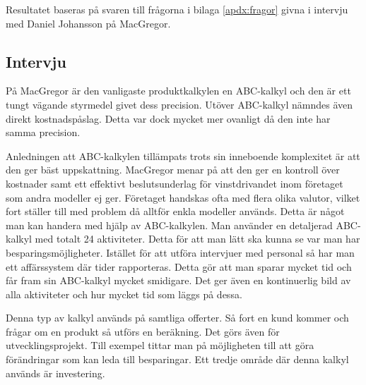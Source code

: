 Resultatet baseras på svaren till frågorna i bilaga \ref{apdx:fragor} givna i intervju med Daniel Johansson på MacGregor. %

%
%

\subsection{Intervju}
På MacGregor är den vanligaste produktkalkylen en ABC-kalkyl och den är ett tungt vägande styrmedel givet dess precision.
Utöver ABC-kalkyl nämndes även direkt kostnadspåslag.
Detta var dock mycket mer ovanligt då den inte har samma precision.

Anledningen att ABC-kalkylen tillämpats trots sin inneboende komplexitet är att den ger bäst uppskattning.
MacGregor menar på att den ger en kontroll över kostnader samt ett effektivt beslutsunderlag för vinstdrivandet inom företaget som andra modeller ej ger.
Företaget handskas ofta med flera olika valutor, vilket fort ställer till med problem då alltför enkla modeller används.
Detta är något man kan handera med hjälp av ABC-kalkylen.
Man använder en detaljerad ABC-kalkyl med totalt 24 aktiviteter.
Detta för att man lätt ska kunna se var man har besparingsmöjligheter.
Istället för att utföra intervjuer med personal så har man ett affärssystem där tider rapporteras.
Detta gör att man sparar mycket tid och får fram sin ABC-kalkyl mycket smidigare.
Det ger även en kontinuerlig bild av alla aktiviteter och hur mycket tid som läggs på dessa.

Denna typ av kalkyl används på samtliga offerter.
Så fort en kund kommer och frågar om en produkt så utförs en beräkning.
Det görs även för utvecklingsprojekt.
Till exempel tittar man på möjligheten till att göra förändringar som kan leda till besparingar.
Ett tredje område där denna kalkyl används är investering.

